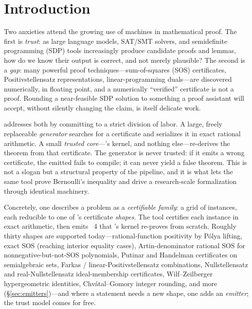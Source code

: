 \section{Introduction}
\label{sec:intro}

Two anxieties attend the growing use of machines in mathematical proof. The first
is \emph{trust}: as large language models, SAT/SMT solvers, and semidefinite
programming (SDP) tools increasingly produce candidate proofs and lemmas, how do
we know their output is correct, and not merely plausible? The second is a
\emph{gap}: many powerful proof techniques---sum-of-squares (SOS) certificates,
Positivstellensatz representations, linear-programming duals---are discovered
numerically, in floating point, and a numerically ``verified'' certificate is not
a proof. Rounding a near-feasible SDP solution to something a proof assistant will
accept, without silently changing the claim, is itself delicate work.

\Telperion{} addresses both by committing to a strict division of labor. A large,
freely replaceable \emph{generator} searches for a certificate and serializes it
in exact rational arithmetic. A small \emph{trusted core}---\Lean's kernel, and
nothing else---re-derives the theorem from that certificate. The generator is
never trusted: if it emits a wrong certificate, the emitted \Lean{} fails to
compile; it can never yield a false theorem. This is not a slogan but a structural
property of the pipeline, and it is what lets the same tool prove Bernoulli's
inequality and drive a research-scale formalization through identical machinery.

Concretely, one describes a problem as a \emph{certifiable family}: a grid of
instances, each reducible to one of \Telperion's certificate \emph{shapes}. The
tool certifies each instance in exact arithmetic, then emits \Lean~4 that
\Mathlib's kernel re-proves from scratch. Roughly thirty shapes are supported
today---rational-function positivity by P\'olya lifting, exact SOS (reaching
interior equality cases), Artin-denominator rational SOS for nonnegative-but-not-SOS
polynomials, Putinar and Handelman certificates on semialgebraic sets, Farkas /
linear-Positivstellensatz combinations, Nullstellensatz and real-Nullstellensatz
ideal-membership certificates, Wilf--Zeilberger hypergeometric identities,
Chv\'atal--Gomory integer rounding, and more (\S\ref{sec:emitters})---and where a
statement needs a new shape, one adds an \emph{emitter}; the trust model comes
for free.

